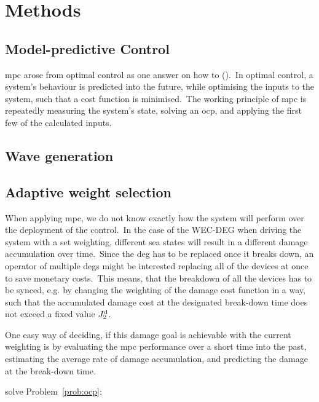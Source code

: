 \section{Methods}

\subsection{Model-predictive Control}
\ac{mpc} arose from optimal control as one answer on how to  (\cite{rawlings2017mpc}).\ 
In optimal control, a system's behaviour is predicted into the future, while optimising the inputs to the system, such that a cost function is minimised.\
The working principle of \ac{mpc} is repeatedly measuring the system's state, solving an \ac{ocp}, and applying the first few of the calculated inputs.\ 

\subsection{Wave generation}

\subsection{Adaptive weight selection}
When applying \ac{mpc}, we do not know exactly how the system will perform over the deployment of the control.\ 
In the case of the WEC-DEG when driving the system with a set weighting, different sea states will result in a different damage accumulation over time.\ 
Since the \ac{deg} has to be replaced once it breaks down, an operator of multiple \acp{deg} might be interested replacing all of the devices at once to save monetary costs.\ 
This means, that the breakdown of all the devices has to be synced, e.g. by changing the weighting of the damage cost function in a way, such that the accumulated damage cost at the designated break-down time does not exceed a fixed value $J^\mathrm{d}_2$.\ 

One easy way of deciding, if this damage goal is achievable with the current weighting is by evaluating the \ac{mpc} performance over a short time into the past, estimating the average rate of damage accumulation, and predicting the damage at the break-down time.\ 
\begin{algorithm}[htb]
\KwIn{$\Jd_i$, \td, $N$, \tf, $k \geq 2$, }
solve Problem~\ref{prob:ocp};
\end{algorithm}